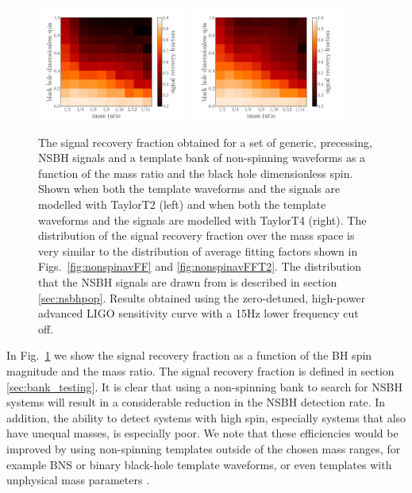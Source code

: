 \begin{figure}
    \centering
    \begin{minipage}[l]{2.0\columnwidth}
    \centering
\includegraphics[width=0.45\textwidth]
{papers/nsbh_effectualness/figure10A.pdf}
\includegraphics[width=0.45\textwidth]
{papers/nsbh_effectualness/figure10B.pdf}
\caption{\label{fig:nonspineffFF}
The signal recovery fraction obtained for a set of generic, precessing, NSBH
signals and a template bank of non-spinning waveforms as a function of the mass
ratio and the black hole dimensionless spin. Shown when both the
template waveforms and the signals are modelled with TaylorT2 (left) and when
both the template waveforms and the signals are modelled with TaylorT4 (right).
The distribution of the signal recovery fraction over the mass space is very 
similar to the distribution of average fitting factors shown in 
Figs.~\ref{fig:nonspinavFF} and \ref{fig:nonspinavFFT2}.
The distribution that the NSBH
signals are drawn from is described in section \ref{sec:nsbhpop}.
Results obtained
using the zero-detuned, high-power advanced LIGO sensitivity curve with a 15Hz
lower frequency cut off.
}
\end{minipage}
\end{figure}

In Fig.~\ref{fig:nonspineffFF} we show
the signal recovery fraction as a function of the \ac{BH} spin magnitude and
the mass ratio. The signal recovery fraction is defined in section 
\ref{sec:bank_testing}.
It is clear that using a non-spinning bank to search for \ac{NSBH} systems will
result in a considerable reduction
in the \ac{NSBH} detection rate. In addition, the ability to
detect systems with high spin, especially systems that also have unequal 
masses, is especially poor.  We note that these efficiencies would be
improved by using non-spinning templates outside of the chosen mass ranges, for
example \ac{BNS} or binary black-hole template waveforms, or even templates
with unphysical mass parameters \cite{Brown:2012qf,Baird:2012cu}.

